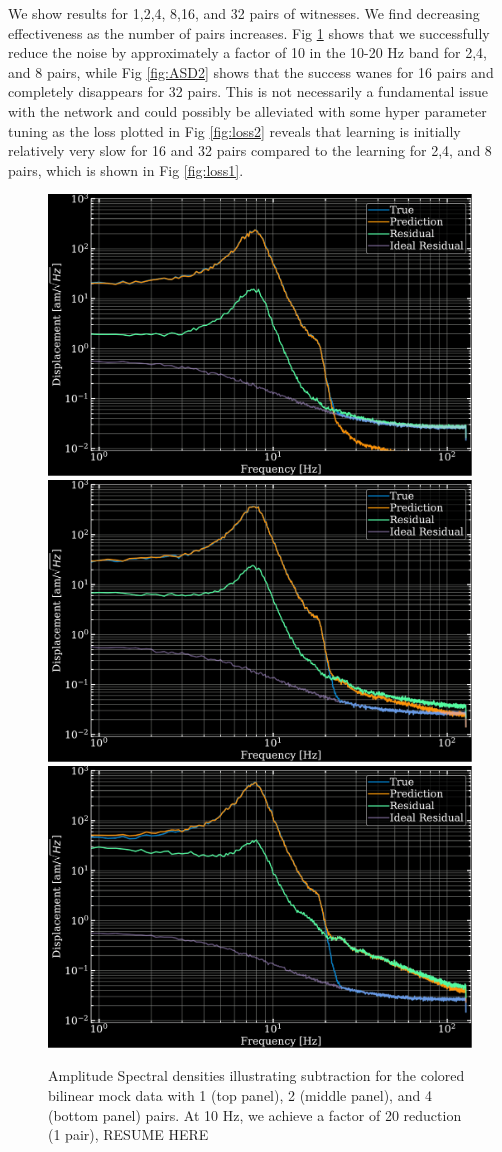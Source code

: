 \begin{refsection}
We show results for 1,2,4, 8,16, and 32 pairs of witnesses. We find decreasing effectiveness as the number of pairs increases. Fig \ref{fig:ASD1} shows that we successfully reduce the noise by approximately a factor of 10 in the 10-20 Hz band for 2,4, and 8 pairs, while Fig \ref{fig:ASD2} shows that the success wanes for 16 pairs and completely disappears for 32 pairs. This is not necessarily a fundamental issue with the network and could possibly be alleviated with some hyper parameter tuning as the loss plotted in Fig \ref{fig:loss2} reveals that learning is initially relatively very slow for 16 and 32 pairs compared to the learning for 2,4, and 8 pairs, which is shown in Fig \ref{fig:loss1}. 

\begin{figure}[htbp]
   \centering
   \includegraphics[width=.7\columnwidth]{chapter_noise_sub/etc/spectra1C}
    \includegraphics[width=.7\columnwidth]{chapter_noise_sub/etc/spectra2C}
     \includegraphics[width=.7\columnwidth]{chapter_noise_sub/etc/spectra4C}
   \caption{Amplitude Spectral densities illustrating subtraction for the colored bilinear mock data with 1 (top panel), 2 (middle panel), and 4 (bottom panel) pairs. At 10 Hz, we achieve a factor of 20 reduction (1 pair),  RESUME HERE}
   \label{fig:ASD1}
\end{figure}


\end{refsection}
